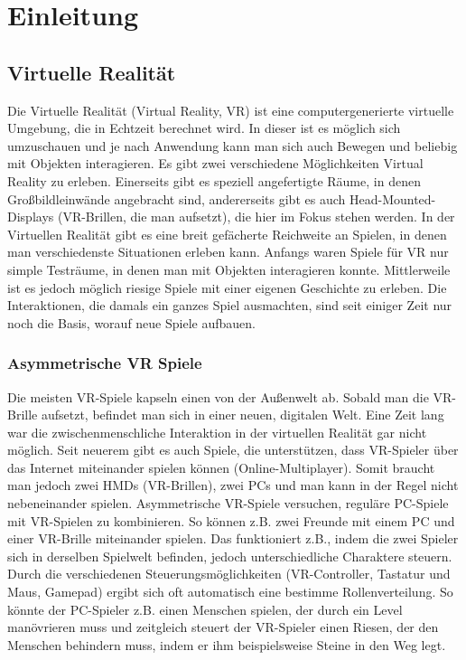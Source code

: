 \chapter{Einleitung}
\label{cha:sa_Einleitung}

\section{Virtuelle Realität}
Die Virtuelle Realität (Virtual Reality, VR) ist eine computergenerierte virtuelle Umgebung, die in Echtzeit berechnet wird. In dieser ist es möglich sich umzuschauen und je nach Anwendung kann man sich auch Bewegen und beliebig mit Objekten interagieren. Es gibt zwei verschiedene Möglichkeiten Virtual Reality zu erleben. Einerseits gibt es speziell angefertigte Räume, in denen Großbildleinwände angebracht sind, andererseits gibt es auch Head-Mounted-Displays (VR-Brillen, die man aufsetzt), die hier im Fokus stehen werden. In der Virtuellen Realität gibt es eine breit gefächerte Reichweite an Spielen, in denen man verschiedenste Situationen erleben kann. Anfangs waren Spiele für VR nur simple Testräume, in denen man mit Objekten interagieren konnte. Mittlerweile ist es jedoch möglich riesige Spiele mit einer eigenen Geschichte zu erleben. Die Interaktionen, die damals ein ganzes Spiel ausmachten, sind seit einiger Zeit nur noch die Basis, worauf neue Spiele aufbauen.

\subsection{Asymmetrische VR Spiele}
Die meisten VR-Spiele kapseln einen von der Außenwelt ab. Sobald man die VR-Brille aufsetzt, befindet man sich in einer neuen, digitalen Welt. Eine Zeit lang war die zwischenmenschliche Interaktion in der virtuellen Realität gar nicht möglich. Seit neuerem gibt es auch Spiele, die unterstützen, dass VR-Spieler über das Internet miteinander spielen können (Online-Multiplayer). Somit braucht man jedoch zwei HMDs (VR-Brillen), zwei PCs und man kann in der Regel nicht nebeneinander spielen. Asymmetrische VR-Spiele versuchen, reguläre PC-Spiele mit VR-Spielen zu kombinieren. So können z.B. zwei Freunde mit einem PC und einer VR-Brille miteinander spielen. Das funktioniert z.B., indem die zwei Spieler sich in derselben Spielwelt befinden, jedoch unterschiedliche Charaktere steuern. Durch die verschiedenen Steuerungsmöglichkeiten (VR-Controller, Tastatur und Maus, Gamepad) ergibt sich oft automatisch eine bestimme Rollenverteilung. So könnte der PC-Spieler z.B. einen Menschen spielen, der durch ein Level manövrieren muss und zeitgleich steuert der VR-Spieler einen Riesen, der den Menschen behindern muss, indem er ihm beispielsweise Steine in den Weg legt.

